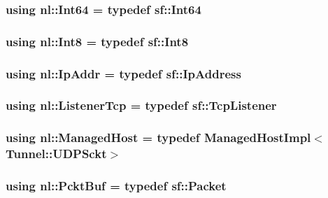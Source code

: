 \subsubsection[{Int64}]{\setlength{\rightskip}{0pt plus 5cm}using {\bf nl\+::\+Int64} = typedef sf\+::\+Int64}\label{namespacenl_af32eb9f8fa8a9a1f7079ca2c01c7ceb9}
\hypertarget{namespacenl_aa6c066586cb28b7eef102ab229f1b37f}{}
\subsubsection[{Int8}]{\setlength{\rightskip}{0pt plus 5cm}using {\bf nl\+::\+Int8} = typedef sf\+::\+Int8}\label{namespacenl_aa6c066586cb28b7eef102ab229f1b37f}
\hypertarget{namespacenl_a62ea075e0e667b99f002ec1af2b5b348}{}
\subsubsection[{Ip\+Addr}]{\setlength{\rightskip}{0pt plus 5cm}using {\bf nl\+::\+Ip\+Addr} = typedef sf\+::\+Ip\+Address}\label{namespacenl_a62ea075e0e667b99f002ec1af2b5b348}
\hypertarget{namespacenl_a57c1656c78f6394db5de75960facff10}{}
\subsubsection[{Listener\+Tcp}]{\setlength{\rightskip}{0pt plus 5cm}using {\bf nl\+::\+Listener\+Tcp} = typedef sf\+::\+Tcp\+Listener}\label{namespacenl_a57c1656c78f6394db5de75960facff10}
\hypertarget{namespacenl_a1686086c19957ab23476f06ad144cd8b}{}
\subsubsection[{Managed\+Host}]{\setlength{\rightskip}{0pt plus 5cm}using {\bf nl\+::\+Managed\+Host} = typedef {\bf Managed\+Host\+Impl}$<${\bf Tunnel\+::\+U\+D\+P\+Sckt}$>$}\label{namespacenl_a1686086c19957ab23476f06ad144cd8b}
\hypertarget{namespacenl_a789b828a23e37a113433c2838e7c8e28}{}
\subsubsection[{Pckt\+Buf}]{\setlength{\rightskip}{0pt plus 5cm}using {\bf nl\+::\+Pckt\+Buf} = typedef sf\+::\+Packet}\label{namespacenl_a789b828a23e37a113433c2838e7c8e28}
\hypertarget{namespacenl_a12899c87e239db66809da0a71fcc9129}{}
